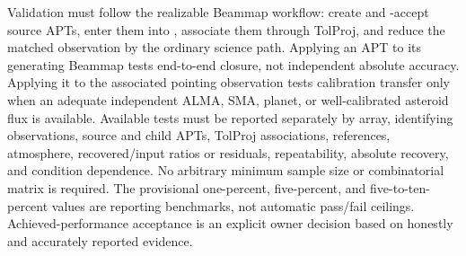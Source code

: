 \begin{description}[style=nextline]
\item[\Req{050}: falsifiability before qualification.]
  Validation must follow the realizable Beammap workflow: create and
  -accept source APTs, enter them into ,
  associate them through TolProj, and reduce the matched observation by the
  ordinary science path. Applying an APT to its generating Beammap tests
  end-to-end closure, not independent absolute accuracy. Applying it to the
  associated pointing observation tests calibration transfer only when an
  adequate independent ALMA, SMA, planet, or well-calibrated asteroid flux is
  available. Available tests must be reported separately by array, identifying
  observations, source and child APTs, TolProj associations, references,
  atmosphere, recovered/input ratios or residuals, repeatability, absolute
  recovery, and condition dependence. No arbitrary minimum sample size or
  combinatorial matrix is required. The provisional one-percent,
  five-percent, and five-to-ten-percent values are reporting benchmarks, not
  automatic pass/fail ceilings. Achieved-performance acceptance is an explicit
  owner decision based on honestly and accurately reported evidence.
\end{description}
